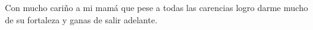 \begin{dedication}
Con mucho cariño a mi mamá que pese a todas las carencias logro darme mucho de su fortaleza y ganas de salir adelante.
\end{dedication}
